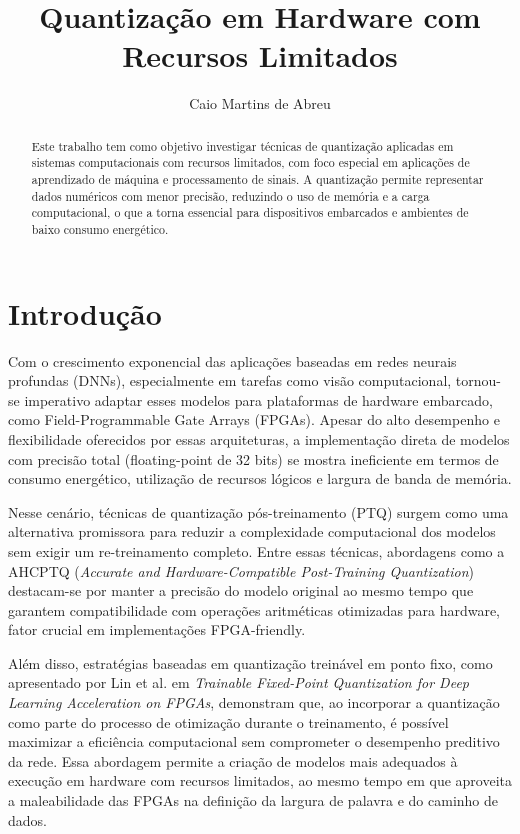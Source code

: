 \documentclass[12pt]{article}
\title{Quantização em Hardware com Recursos Limitados}
\author{Caio Martins de Abreu}
\date{}
\begin{document}
\maketitle

\begin{abstract}
Este trabalho tem como objetivo investigar técnicas de quantização aplicadas em sistemas computacionais com recursos limitados, com foco especial em aplicações de aprendizado de máquina e processamento de sinais. A quantização permite representar dados numéricos com menor precisão, reduzindo o uso de memória e a carga computacional, o que a torna essencial para dispositivos embarcados e ambientes de baixo consumo energético.
\end{abstract}

\section{Introdução}

Com o crescimento exponencial das aplicações baseadas em redes neurais profundas (DNNs), especialmente em tarefas como visão computacional, tornou-se imperativo adaptar esses modelos para plataformas de hardware embarcado, como Field-Programmable Gate Arrays (FPGAs). Apesar do alto desempenho e flexibilidade oferecidos por essas arquiteturas, a implementação direta de modelos com precisão total (floating-point de 32 bits) se mostra ineficiente em termos de consumo energético, utilização de recursos lógicos e largura de banda de memória.

Nesse cenário, técnicas de quantização pós-treinamento (PTQ) surgem como uma alternativa promissora para reduzir a complexidade computacional dos modelos sem exigir um re-treinamento completo. Entre essas técnicas, abordagens como a AHCPTQ (\textit{Accurate and Hardware-Compatible Post-Training Quantization}) destacam-se por manter a precisão do modelo original ao mesmo tempo que garantem compatibilidade com operações aritméticas otimizadas para hardware, fator crucial em implementações FPGA-friendly.

Além disso, estratégias baseadas em quantização treinável em ponto fixo, como apresentado por Lin et al. em \textit{Trainable Fixed-Point Quantization for Deep Learning Acceleration on FPGAs}, demonstram que, ao incorporar a quantização como parte do processo de otimização durante o treinamento, é possível maximizar a eficiência computacional sem comprometer o desempenho preditivo da rede. Essa abordagem permite a criação de modelos mais adequados à execução em hardware com recursos limitados, ao mesmo tempo em que aproveita a maleabilidade das FPGAs na definição da largura de palavra e do caminho de dados.
\end{document}

